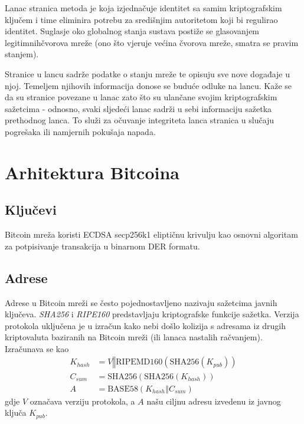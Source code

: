\documentclass[utf8, zavrsni]{fer}
\begin{document}
Lanac stranica metoda je koja izjednačuje identitet sa samim kriptografskim ključem i time eliminira potrebu za središnjim autoritetom koji bi regulirao identitet. Suglasje oko globalnog stanja sustava postiže se glasovanjem legitimnih\footnotemark čvorova mreže (ono što vjeruje većina čvorova mreže, smatra se pravim stanjem).

Stranice u lancu sadrže podatke o stanju mreže te opisuju sve nove događaje u njoj. Temeljem njihovih informacija donose se buduće odluke na lancu. Kaže se da su stranice povezane u lanac zato što su ulančane svojim kriptografskim sažetcima - odnosno, svaki sljedeći lanac sadrži u sebi informaciju sažetka prethodnog lanca. To služi za očuvanje integriteta lanca stranica u slučaju pogrešaka ili namjernih pokušaja napada.


\section{Arhitektura Bitcoina}
\subsection{Ključevi}
Bitcoin mreža koristi ECDSA secp256k1 eliptičnu krivulju kao osnovni algoritam za potpisivanje transakcija u binarnom DER formatu.
\subsection{Adrese}
Adrese u Bitcoin mreži se često pojednostavljeno nazivaju sažetcima javnih ključeva. \textit{SHA256} i \textit{RIPE160} predstavljaju kriptografske funkcije sažetka. Verzija protokola uključena je u izračun kako nebi došlo kolizija s adresama iz drugih kriptovaluta baziranih na Bitcoin mreži (ili lanaca nastalih račvanjem). Izračunava se kao
\begin{equation} \label{eq2}
\begin{split}
K_{hash} &= V \mathbin\Vert \mathrm{RIPEMD160}(\mathrm{SHA256}(K_{pub})) \\
C_{sum}  &= \mathrm{SHA256}(\mathrm{SHA256}(K_{hash})) \\
A        &= \mathrm{BASE58}(K_{hash} \mathbin\Vert C_{sum})
\end{split}
\end{equation}
gdje $ V $ označava verziju protokola, a $A$ našu ciljnu adresu izvedenu iz javnog ključa $K_{pub}$.
\end{document}
